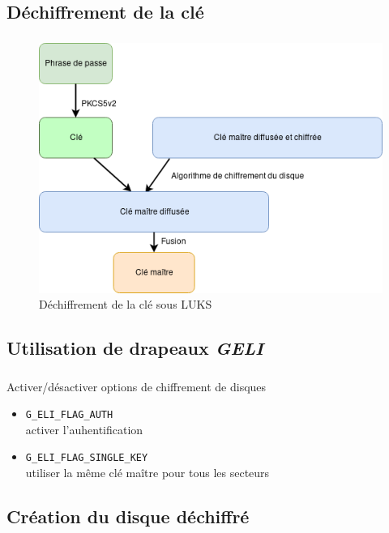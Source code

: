 \subsection{Déchiffrement de la clé}

\begin{frame}
	\frametitle{\insertsubsectionhead}
	\begin{figure}
		\includegraphics[width=.7\textwidth]{developpement/dechiffrement_cle}
		\caption{Déchiffrement de la clé sous LUKS}
	\end{figure}
\end{frame}

\subsection{Utilisation de drapeaux \textit{GELI}}

\begin{frame}
  \frametitle{\insertsubsectionhead}
  \begin{block}{Activer/désactiver options de chiffrement de disques}
    \begin{itemize}
    \item \texttt{G\_ELI\_FLAG\_AUTH} \\
      \textrightarrow{} activer l'auhentification
    \item \texttt{G\_ELI\_FLAG\_SINGLE\_KEY} \\
      \textrightarrow{} utiliser la même clé maître pour tous les secteurs
    \end{itemize}
  \end{block}
\end{frame}

\subsection{Création du disque déchiffré}

